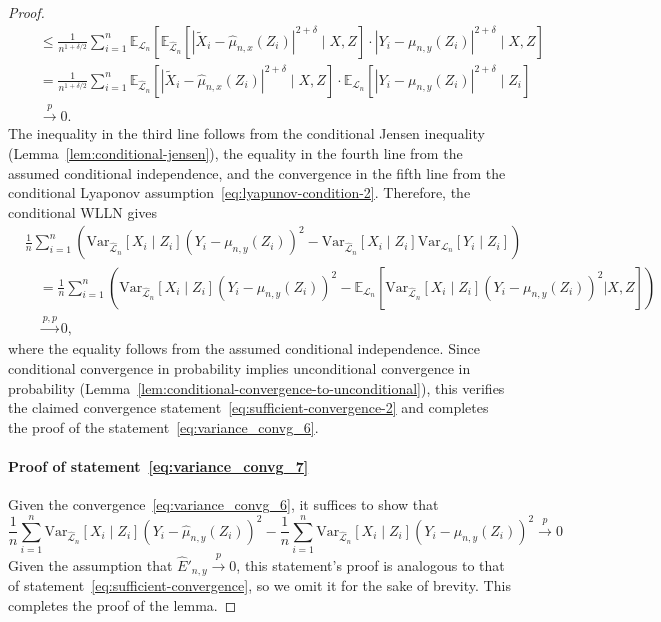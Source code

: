 \documentclass[aos]{imsart}
\theoremstyle{definition}
\theoremstyle{remark}
\newcommand{\E}{\mathbb E}								%
\newcommand{\V}{\mathrm{Var}}							%
\newcommand{\convp}{\overset p \rightarrow}             %
\newcommand{\srx}{X}									%
\newcommand{\srz}{Z}									%
\newcommand{\srxk}{\widetilde X}						%
\newcommand{\sry}{Y}									%
\newcommand{\law}{\mathcal L}							%
\newcommand{\lawhat}{\widehat{\mathcal L}}				%
\newcommand{\convpp}{\overset {p,p} \longrightarrow}    %
\begin{document}
\begin{proof}
\begin{align*}
		&\quad\leq \frac{1}{n^{1+\delta/2}} \sum_{i = 1}^n \E_{\law_n}\left[\E_{\lawhat_n}[|\srxk_i-\widehat{\mu}_{n,x}(Z_i)|^{2+\delta} \mid \srx, \srz] \cdot |\sry_i-\mu_{n,y}(Z_i)|^{2+\delta} \mid \srx,\srz\right]\\
		&\quad= \frac{1}{n^{1+\delta/2}} \sum_{i = 1}^n \E_{\lawhat_n}[|\srxk_i-\widehat\mu_{n,x}(Z_i)|^{2+\delta}\mid \srx, \srz] \cdot \E_{\law_n}\left[|\sry_i-\mu_{n,y}(Z_i)|^{2+\delta} \mid Z_i\right]\\
		&\quad\convp 0. 
	\end{align*}
	The inequality in the third line follows from the conditional Jensen inequality (Lemma~\ref{lem:conditional-jensen}), the equality in the fourth line from the assumed conditional independence, and the convergence in the fifth line from the conditional Lyaponov assumption~\eqref{eq:lyapunov-condition-2}. Therefore, the conditional WLLN gives
	\begin{equation*}
		\begin{split}
			&\frac{1}{n} \sum_{i=1}^n \left(\V_{\lawhat_n}[\srx_i\mid \srz_i](\sry_i-\mu_{n,y}(\srz_i))^2- \V_{\lawhat_n}[\srx_i\mid \srz_i]\V_{\law_n}[\sry_i \mid \srz_i]\right) \\
			&\quad = \frac{1}{n} \sum_{i=1}^n \left(\V_{\lawhat_n}[\srx_i\mid \srz_i](\sry_i-\mu_{n,y}(\srz_i))^2- \E_{\law_n}[\V_{\lawhat_n}[\srx_i\mid \srz_i](\sry_i-\mu_{n,y}(\srz_i))^2 | \srx, \srz]\right) \\
			&\quad \convpp 0,
		\end{split}
	\end{equation*}
	where the equality follows from the assumed conditional independence. Since conditional convergence in probability implies unconditional convergence in probability (Lemma~\ref{lem:conditional-convergence-to-unconditional}), this verifies the claimed convergence statement~\eqref{eq:sufficient-convergence-2} and completes the proof of the statement~\eqref{eq:variance_convg_6}.
	
	\paragraph*{Proof of statement~\eqref{eq:variance_convg_7}} 
	
	Given the convergence~\eqref{eq:variance_convg_6}, it suffices to show that
	\begin{equation}
		\frac{1}{n}\sum_{i=1}^n \V_{\lawhat_n}[\srx_i\mid \srz_i](\sry_i-\widehat \mu_{n,y}(\srz_i))^2-\frac{1}{n}\sum_{i=1}^n \V_{\lawhat_n}[\srx_i\mid \srz_i](\sry_i-\mu_{n,y}(\srz_i))^2
		\convp 0
	\end{equation}
	Given the assumption that $\widehat E'_{n,y} \convp 0$, this statement's proof is analogous to that of statement~\eqref{eq:sufficient-convergence}, so we omit it for the sake of brevity. This completes the proof of the lemma.
\end{proof}
\end{document}
